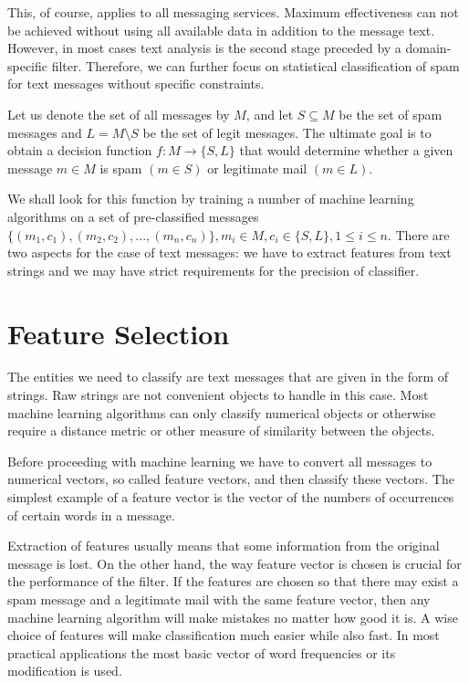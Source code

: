 \documentclass[12pt]{report}
\begin{document}
This, of course, applies to all messaging services. Maximum effectiveness can not be achieved without using all available data in addition to the message text. However, in most cases text analysis is the second stage preceded by a domain-specific filter. Therefore, we can further focus on statistical classification of spam for text messages without specific constraints.

Let us denote the set of all messages by $M$, and let $S \subseteq M$ be the set of spam messages and $L = M \setminus S$ be the set of legit messages. The ultimate goal is to obtain a decision function $f : M \rightarrow \{S, L\}$ that would determine whether a given message $m \in M$ is spam $(m \in S)$ or legitimate mail $(m \in L)$.

We shall look for this function by training a number of machine learning algorithms on a set of pre-classified messages $\{(m_1, c_1), (m_2, c_2), ..., (m_n, c_n)\}, m_i \in M, c_i \in \{S, L\}, 1 \leq i \leq n$. There are two aspects for the case of text messages: we have to extract features from text strings and we may have strict requirements for the precision of classifier.

\newpage

\section{Feature Selection}

The entities we need to classify are text messages that are given in the form of strings. Raw strings are not convenient objects to handle in this case. Most machine learning algorithms can only classify numerical objects or otherwise require a distance metric or other measure of similarity between the objects.

Before proceeding with machine learning we have to convert all messages to numerical vectors, so called feature vectors, and then classify these vectors. The simplest example of a feature vector is the vector of the numbers of occurrences of certain words in a message. 

Extraction of features usually means that some information from the original message is lost. On the other hand, the way feature vector is chosen is crucial for the performance of the filter. If the features are chosen so that there may exist a spam message and a legitimate mail with the same feature vector, then any machine learning algorithm will make mistakes no matter how good it is. A wise choice of features will make classification much easier while also fast. In most practical applications the most basic vector of word frequencies or its modification is used.
\end{document}
